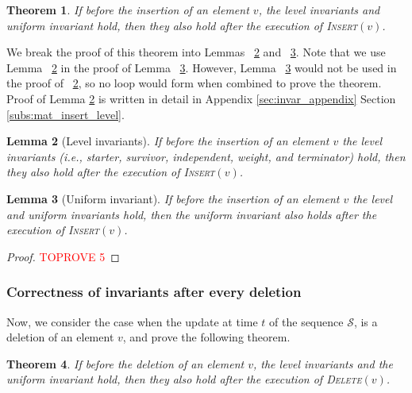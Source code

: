 \documentclass[11pt]{article}
\newtheorem{theorem}{Theorem}
\newtheorem{lemma}[theorem]{Lemma}
\newcommand{\insertv}{{\textsc{Insert}}}
\newcommand{\deletev}{{\textsc{Delete}}}
\begin{document}
\begin{theorem}
\label{mat_insert:invariants}
If before the insertion of an element $v$, the level invariants and uniform invariant hold, then they also hold after the execution of \insertv$(v)$. 
\end{theorem}

We break the proof of this theorem into Lemmas ~\ref{mat_insert_level} and ~\ref{mat_insert_uni}. 
Note that we use Lemma ~\ref{mat_insert_level} in the proof of Lemma ~\ref{mat_insert_uni}. However, Lemma ~\ref{mat_insert_uni} would not be used in the proof of ~\ref{mat_insert_level}, so no loop would form when combined to prove the theorem. Proof of Lemma \ref{mat_insert_level} is written in detail in Appendix \ref{sec:invar_appendix} Section \ref{subs:mat_insert_level}. 


\begin{lemma} [Level invariants]
\label{mat_insert_level}
If before the insertion of an element $v$ the level invariants (i.e., starter, survivor, independent, weight, and terminator) hold, 
then they also hold after the execution of \insertv$(v)$. 
\end{lemma}


\begin{lemma} [Uniform invariant]
\label{mat_insert_uni}
If before the insertion of an element $v$ the level and uniform invariants hold, then the uniform invariant also holds after the execution of \insertv$(v)$. 
\end{lemma}

\begin{proof}\textcolor{red}{TOPROVE 5}\end{proof}







\subsubsection{Correctness of invariants after every deletion}

Now, we consider the case when the update at time $t$ of the sequence $\mathcal{S}$, is a deletion of an element $v$, and prove the following theorem. 

\begin{theorem}
\label{mat_delete:invariants}
If before the deletion of an element $v$, the level invariants and the uniform invariant hold, then they also hold after the execution of \deletev$(v)$. 
\end{theorem}
\end{document}
